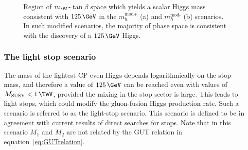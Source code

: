 \begin{figure}[htbp]
\caption[Region of $m_{\PA}$-$\tan\beta$ space which yields a scalar Higgs mass 
consistent with $125\,\GeV$ in the $m_{h}^{\text{mod}}$ scenarios.]
{Region of $m_{\PA}$-$\tan\beta$ space which yields a scalar Higgs mass 
consistent with $125\,\GeV$ in the $m_{h}^{\text{mod+}}$ (a) and
$m_{h}^{\text{mod-}}$ (b) scenarios. In such modified scenarios, the
majority of phase space is consistent with the discovery of a $125\,\GeV$ Higgs.}
\label{fig:mhmodmass}
\end{figure}

\subsubsection{The light stop scenario}
\label{sec:lightstopscenario}

The mass of the lightest CP-even Higgs depends logarithmically on the stop mass,
and therefore a value of $125\,\GeV$ can be reached even with values of
$M_{\text{SUSY}} < 1\,\TeV$, provided the mixing in the stop sector is large. This
leads to light stops, which could modify the gluon-fusion Higgs production rate.
Such a scenario is referred to as the light-stop scenario. This scenario is
defined to be in agreement with current results of direct searches for stops.
Note that in this scenario $M_{1}$ and $M_{2}$ are not related by the GUT
relation in equation~\ref{eq:GUTrelation}. 

